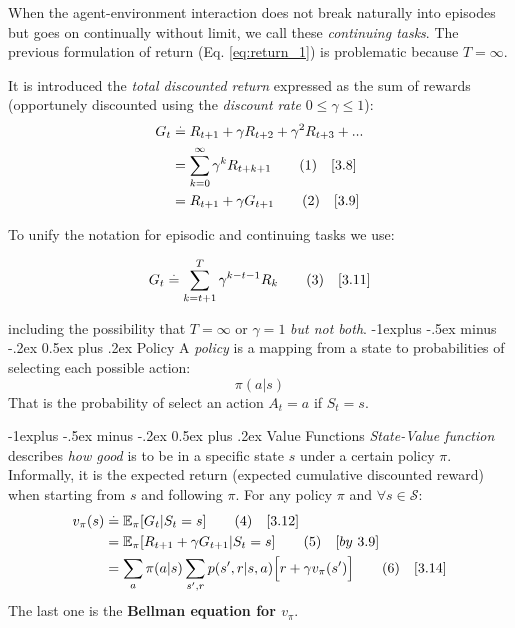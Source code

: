 \documentclass[10pt,landscape]{article}
\makeatletter
\renewcommand{\subsection}{\@startsection{subsection}{2}{0mm}%
                                {-1explus -.5ex minus -.2ex}%
                                {0.5ex plus .2ex}%
                                {\normalfont\normalsize\bfseries}}
\newcommand\numberthis{\addtocounter{equation}{1}\tag{\theequation}}
\makeatother
\begin{document}
\begin{multicols}{3}
When the agent-environment interaction does not break naturally into episodes but goes on continually without limit, we call these \emph{continuing tasks}.
The previous formulation of return (Eq. \ref{eq:return_1}) is problematic because $T=\infty$. 

It is introduced the \emph{total discounted return} expressed as the sum of rewards (opportunely discounted using the \emph{discount rate} $0 \le \gamma \le 1$):
\begin{align*}
G_t & \stackrel{.}{=} R_{t+1} + \gamma R_{t+2} + \gamma^2 R_{t+3} + ...\\
& = \sum_{k = 0}^\infty \gamma^k R_{t + k + 1} \numberthis \label{eq:discounted_return_1} \quad [3.8]\\
& = R_{t+1} + \gamma G_{t+1} \numberthis \label{eq:discounted_return_2} \quad [3.9]
\end{align*}

To unify the notation for episodic and continuing tasks we use:

\begin{equation}
G_t \stackrel{.}{=} \sum_{k = t+1}^T \gamma^{k-t-1} R_{k} \numberthis \label{eq:discounted_return_generic} \quad [3.11]
\end{equation}

including the possibility that $T=\infty$ or $\gamma = 1$ \emph{but not both}.
\subsection{Policy}
A \emph{policy} is a mapping from a state to probabilities of selecting each possible action:
\begin{equation}
\pi(a|s)
\label{eq: policy}
\end{equation}
That is the probability of select an action $A_t = a$ if $S_t = s$.

\subsection{Value Functions}
\emph{State-Value function} describes \emph{how good} is to be in a specific state $s$ under a certain policy $\pi$.
Informally, it is the expected return (expected cumulative discounted reward) when starting from $s$ and following $\pi$. For any policy $\pi$ and $\forall s \in \mathcal{S}$:
\begin{align*}
v_{\pi}(s) & \stackrel{.}{=} \mathbb{E}_{\pi}[G_t | S_t = s] \numberthis \label{eq:v_def} \quad [3.12] \\
& = \mathbb{E}_{\pi}[R_{t+1} + \gamma G_{t+1} | S_t = s] \numberthis  \quad [by \ 3.9] \\
& = \sum_{a} \pi(a|s) \sum_{s' ,r} p(s',r | s, a) \Big[r + \gamma v_{\pi}(s')\Big] \numberthis \label{eq:v_bellman} \quad [3.14]
\end{align*}
The last one is the \textbf{Bellman equation for $v_\pi$}.


\end{multicols}
\end{document}
